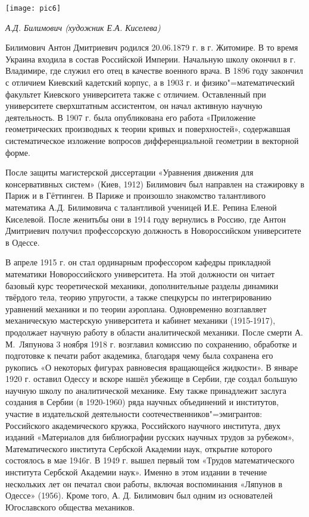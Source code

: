\begin{center}
\texttt{[image: pic6]}

{\it А.Д. Билимович (художник Е.А. Киселева)}
\end{center}

Билимович Антон Дмитриевич родился 20.06.1879 г. в г. Житомире. В то время Украина входила в состав Российской Империи. Начальную школу окончил в г. Владимире, где служил его отец в качестве военного врача. В 1896 году закончил с отличием Киевский кадетский корпус, а в 1903 г. и физико"=математический факультет Киевского университета также с отличием. Оставленный при университете сверхштатным ассистентом, он начал активную научную деятельность. В 1907 г. была опубликована его работа «Приложение геометрических производных к теории кривых и поверхностей», содержавшая систематическое изложение вопросов дифференциальной геометрии в векторной форме.

После защиты магистерской диссертации «Уравнения движения для консервативных систем» (Киев, 1912) Билимович был направлен на стажировку в Париж и в Гёттинген. В Париже и произошло знакомство талантливого математика А.Д. Билимовича с талантливой ученицей И.Е. Репина Еленой Киселевой. После женитьбы они в 1914 году вернулись в Россию, где Антон Дмитриевич получил профессорскую должность в Новороссийском университете в Одессе.

В апреле 1915 г. он стал ординарным профессором кафедры прикладной математики Новороссийского университета. На этой должности он читает базовый курс теоретической механики, дополнительные разделы динамики твёрдого тела, теорию упругости, а также спецкурсы по интегрированию уравнений механики и по теории аэроплана. Одновременно возглавляет механическую мастерскую университета и кабинет механики (1915-1917), продолжает научную работу в области аналитической механики.
После смерти А.\,М.~Ляпунова 3 ноября 1918 г. возглавил комиссию по сохранению, обработке и подготовке к печати работ академика, благодаря чему была сохранена его рукопись «О некоторых фигурах равновесия вращающейся жидкости».
В январе 1920 г. оставил Одессу и вскоре нашёл убежище в Сербии, где создал большую научную школу по аналитической механике. Ему также принадлежит заслуга создания в Сербии (в 1920-1960) ряда научных объединений и институтов, участие в издательской деятельности соотечественников"=эмигрантов: Российского академического кружка, Российского научного института, двух изданий «Материалов для библиографии русских научных трудов за рубежом», Математического института Сербской Академии наук, открытие которого состоялось в мае 1946г. В 1949 г. вышел первый том «Трудов математического института Сербской Академии наук». Именно в этом издании в течение нескольких лет он печатал свои работы, включая воспоминания «Ляпунов в Одессе» (1956). Кроме того, А. Д. Билимович был одним из основателей Югославского общества механиков.


